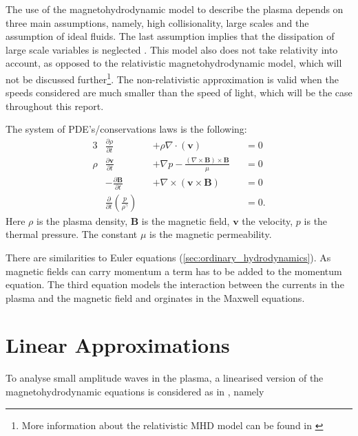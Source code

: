 \documentclass[a4paper]{article}
\begin{document}
The use of the magnetohydrodynamic model to describe the plasma depends on three main assumptions, namely, high collisionality, large scales and the assumption of ideal fluids. The last assumption implies that the dissipation of large scale variables is neglected \cite{goedbloed2004principles}. This model also does not take relativity into account, as opposed to the relativistic magnetohydrodynamic model, which will not be discussed further\footnote{More information about the relativistic MHD model can be found in \cite{karas2005introduction}}. The non-relativistic approximation is valid when the speeds considered are much smaller than the speed of light, which will be the case throughout this report.

The system of PDE's/conservations laws is the following:
\begin{alignat}{3}
    &\frac{\partial \rho}{\partial t} &&+ \rho \nabla  \cdot (\mathbf v) &&= 0 \tag{mass}\label{eq:mass}\\
    \rho&\frac{\partial \mathbf v}{\partial t} &&+  \nabla p - \frac{(\nabla \times \mathbf{B}) \times \mathbf{B}}{\mu} &&= 0 \tag{moment}\label{eq:cauchymoment}\\
    &-\frac{\partial \mathbf B}{\partial t} &&+ \nabla \times (\mathbf{v} \times \mathbf{B}) &&= 0 \tag{charge}\label{eq:faraday}\\
    &\frac{\partial}{\partial t}\left(\frac{p}{\rho^\gamma}\right) && &&= 0 \tag{energy}\label{eq:energy}.
\end{alignat} 
Here $\rho$ is the plasma density, $\mathbf B$ is the magnetic field,  $\mathbf v$ the velocity, $p$ is the thermal pressure. The constant $\mu$ is the magnetic permeability. 

There are similarities to Euler equations (\cref{sec:ordinary_hydrodynamics}).
As magnetic fields can carry momentum \cite[section 8.2]{GriffithsDavidJeffery2017Ite} a term has to be added to the momentum equation. 
The third equation models the interaction between the currents in the plasma and the magnetic field and orginates in the Maxwell equations.

\section{Linear Approximations} \label{sec:linear_approximations}

To analyse small amplitude waves in the plasma, a linearised version of the magnetohydrodynamic equations is considered as in \cite{Fitzpatricknotes}, namely
\end{document}
